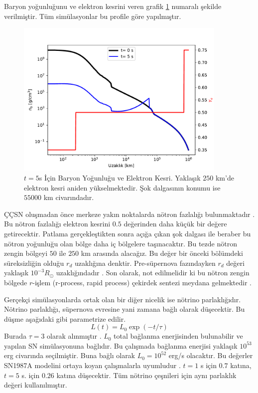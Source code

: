 Baryon yoğunluğunu ve elektron kesrini veren grafik \ref{fig:t5s_nbYe2dist} numaralı şekilde verilmiştir. Tüm simülasyonlar bu profile göre yapılmıştır.

\begin{figure}[hbt!]
    \centering
    \includegraphics[width=0.9\textwidth]{figures/t5s_nbYe2dist.pdf}
    \caption[$ t=5 $s İçin Baryon Yoğunluğu ve Elektron Kesri.]{$ t=5 $s İçin Baryon Yoğunluğu ve Elektron Kesri. Yaklaşık $250$ km'de elektron kesri aniden yükselmektedir. Şok dalgasının konumu ise $55000$ km civarındadır.}
    \label{fig:t5s_nbYe2dist}
\end{figure}

ÇÇSN oluşmadan önce merkeze yakın noktalarda nötron fazlalığı bulunmaktadır \cite{Athar:1995cx}. Bu nötron fazlalığı elektron kesrini $ 0.5 $ değerinden daha küçük bir değere getirecektir. Patlama gerçekleştikten sonra açığa çıkan şok dalgası ile beraber bu nötron yoğunluğu olan bölge daha iç bölgelere taşınacaktır. Bu tezde nötron zengin bölgeyi $ 50 $ ile $ 250 $ km arasında alacağız. Bu değer bir önceki bölümdeki süreksizliğin olduğu $ r_{d} $ uzaklığına denktir. Pre-süpernova fazındayken $ r_{d} $ değeri yaklaşık $ 10^{-3} R_{\odot} $ uzaklığındadır \cite{Athar:1995cx}. Son olarak, not edilmelidir ki bu nötron zengin bölgede $ r $-işlem (r-process, rapid process) çekirdek sentezi meydana gelmektedir \cite{Janka:2006fh,Arnould:2007gh,Qian:1996xt}.

Gerçekçi simülasyonlarda ortak olan bir diğer nicelik ise nötrino parlaklığıdır. Nötrino parlaklığı, süpernova evresine yani zamana bağlı olarak düşecektir. Bu düşme aşağıdaki gibi parametrize edilir.
\begin{equation}
    L(t)= L_{0}\exp(-t/\tau)
\end{equation}
Burada $ \tau=3 $ olarak alınmıştır \cite{2017hsn..book.1605R, Mirizzi:2015eza}. $ L_{0} $ total bağlanma enerjisinden bulunabilir ve yapılan SN simülasyonuna bağlıdır. Bu çalışmada bağlanma enerjisi yaklaşık $ 10^{53} $ erg civarında seçilmiştir. Buna bağlı olarak $ L_{0}=10^{52} $ erg/s olacaktır. Bu değerler SN1987A modelini ortaya koyan çalışmalarla uyumludur \cite{fukugita2013physics}. $ t=1 $ s için $ 0.7 $ katına, $ t=5 $ s. için $0.26$ katına düşecektir. Tüm nötrino çeşnileri için aynı parlaklık değeri kullanılmıştır.

